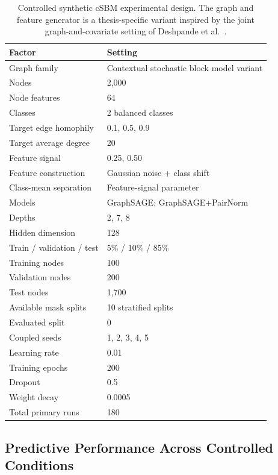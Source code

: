 \documentclass[english]{lni}
\begin{document}
\begin{table}[htbp]
\centering
\caption{Controlled synthetic cSBM experimental design. The graph and feature generator is a thesis-specific variant inspired by the joint graph-and-covariate setting of Deshpande et al.\ \cite{deshpande2018csbm}.}
\label{tab:csbm-design}
\small
\begin{tabular}{ll}
\toprule
Factor & Setting\\
\midrule
Graph family & Contextual stochastic block model variant\\
Nodes & 2,000\\
Node features & 64\\
Classes & 2 balanced classes\\
Target edge homophily & 0.1, 0.5, 0.9\\
Target average degree & 20\\
Feature signal & 0.25, 0.50\\
Feature construction & Gaussian noise + class shift\\
Class-mean separation & Feature-signal parameter\\
Models & GraphSAGE; GraphSAGE+PairNorm\\
Depths & 2, 7, 8\\
Hidden dimension & 128\\
Train / validation / test & 5\% / 10\% / 85\%\\
Training nodes & 100\\
Validation nodes & 200\\
Test nodes & 1,700\\
Available mask splits & 10 stratified splits\\
Evaluated split & 0\\
Coupled seeds & 1, 2, 3, 4, 5\\
Learning rate & 0.01\\
Training epochs & 200\\
Dropout & 0.5\\
Weight decay & 0.0005\\
Total primary runs & 180\\
\bottomrule
\end{tabular}
\end{table}

\subsection{Predictive Performance Across Controlled Conditions}
\label{sec:csbm-performance}
\end{document}
